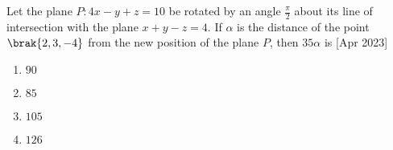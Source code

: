 \item Let the plane $P:4x-y+z=10$ be rotated by an angle $\frac{\pi}{2}$ about its line of intersection with the plane $x+y-z=4$. If $\alpha$ is the distance of the point $\brak{2,3,-4}$ from the new position of the plane $P$, then $35\alpha$ is \hfill[Apr 2023]
\begin{enumerate}
      \item $90$
       \item $85$
       \item $105$
       \item $126$
\end{enumerate}

